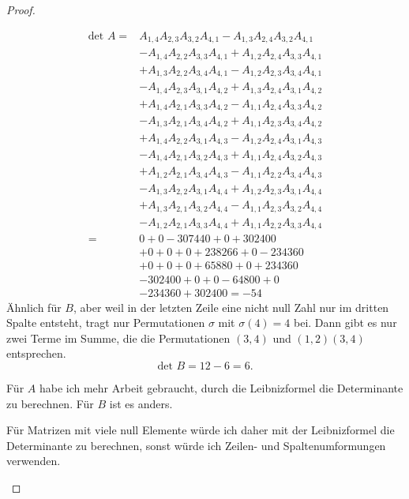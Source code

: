 \begin{proof}
\begin{parts}
\begin{align*}
		\text{det }A=& A_{1,4} A_{2,3} A_{3,2} A_{4,1}-A_{1,3} A_{2,4} A_{3,2} A_{4,1}\\&-A_{1,4} A_{2,2} A_{3,3} A_{4,1}+A_{1,2} A_{2,4} A_{3,3} A_{4,1}\\&+A_{1,3} A_{2,2} A_{3,4} A_{4,1}-A_{1,2} A_{2,3} A_{3,4} A_{4,1}\\&-A_{1,4} A_{2,3} A_{3,1} A_{4,2}+A_{1,3} A_{2,4} A_{3,1} A_{4,2}\\&+A_{1,4} A_{2,1} A_{3,3} A_{4,2}-A_{1,1} A_{2,4} A_{3,3} A_{4,2}\\&-A_{1,3} A_{2,1} A_{3,4} A_{4,2}+A_{1,1} A_{2,3} A_{3,4} A_{4,2}\\&+A_{1,4} A_{2,2} A_{3,1} A_{4,3}-A_{1,2} A_{2,4} A_{3,1} A_{4,3}\\&-A_{1,4} A_{2,1} A_{3,2} A_{4,3}+A_{1,1} A_{2,4} A_{3,2} A_{4,3}\\&+A_{1,2} A_{2,1} A_{3,4} A_{4,3}-A_{1,1} A_{2,2} A_{3,4} A_{4,3}\\&-A_{1,3} A_{2,2} A_{3,1} A_{4,4}+A_{1,2} A_{2,3} A_{3,1} A_{4,4}\\&+A_{1,3} A_{2,1} A_{3,2} A_{4,4}-A_{1,1} A_{2,3} A_{3,2} A_{4,4}\\&-A_{1,2} A_{2,1} A_{3,3} A_{4,4}+A_{1,1} A_{2,2} A_{3,3} A_{4,4}\\
		=& 0 + 0 -307440 + 0 + 302400\\ &+ 0 + 0 + 0 + 238266 + 0 -234360 \\&+ 0 + 0 + 0 + 65880 + 0 + 234360 \\&-302400 + 0 + 0 -64800 + 0 \\&-234360 + 302400=-54 
	\end{align*}
	Ähnlich für $B$, aber weil in der letzten Zeile eine nicht null Zahl nur im dritten Spalte entsteht, tragt nur Permutationen $\sigma$ mit $\sigma(4)=4$ bei. Dann gibt es nur zwei Terme im Summe, die die Permutationen $(3,4)$ und $(1,2)(3,4)$ entsprechen. 
	\[
		\text{det }B=12-6=6
	.\] 
\item F\"{u}r $A$ habe ich mehr Arbeit gebraucht, durch die Leibnizformel die Determinante zu berechnen. F\"{u}r $B$ ist es anders.

	F\"{u}r Matrizen mit viele null Elemente würde ich daher mit der Leibnizformel die Determinante zu berechnen, sonst würde ich Zeilen- und Spaltenumformungen verwenden.\qedhere
	\end{parts}
\end{proof}

